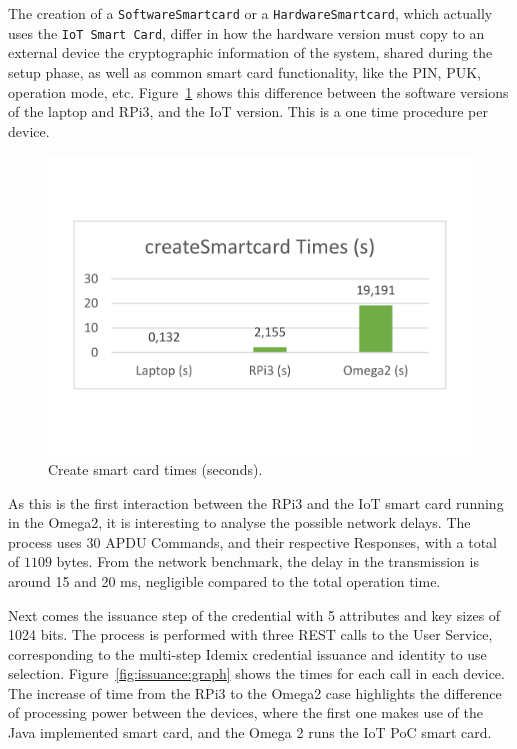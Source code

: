 The creation of a \texttt{SoftwareSmartcard} or a \texttt{HardwareSmartcard}, which actually uses the \texttt{IoT Smart Card}, differ in how the hardware version must copy to an external device the cryptographic information of the system, shared during the setup phase, as well as common smart card functionality, like the PIN, PUK, operation mode, etc. Figure~\ref{fig:createSmartCard:graph} shows this difference between the software versions of the laptop and RPi3, and the IoT version. This is a one time procedure per device.


\begin{figure}[bth]
	\centering
	\includegraphics[width=0.6\linewidth]{gfx/graphics/createSCGraph}
	\caption{Create smart card times (seconds).} 
	\label{fig:createSmartCard:graph} 
\end{figure}



As this is the first interaction between the RPi3 and the IoT smart card running in the Omega2, it is interesting to analyse the possible network delays. The process uses $30$ APDU Commands, and their respective Responses, with a total of $1109$ bytes. From the network benchmark, the delay in the transmission is around 15 and 20 ms, negligible compared to the total operation time.


\hfil

Next comes the issuance step of the credential with  5 attributes and key sizes of 1024 bits. The process is performed with three REST calls to the User Service, corresponding to the multi-step Idemix credential issuance and identity to use selection. Figure~\ref{fig:issuance:graph} shows the times for each call in each device. The increase of time from the RPi3 to the Omega2 case highlights the difference of processing power between the devices, where the first one makes use of the Java implemented smart card, and the Omega 2 runs the IoT PoC smart card.



